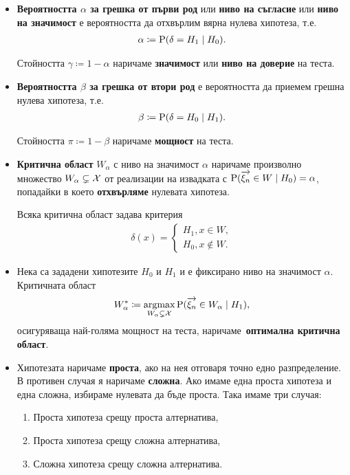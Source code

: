\documentclass[numbers=endperiod, bibliography=totocnumbered]{scrartcl}
\begin{document}
\begin{definition}[Хипотези]
\begin{itemize}
    \item \textbf{Вероятността \( \alpha \) за грешка от първи род} или \textbf{ниво на съгласие} или \textbf{ниво на значимост} е вероятността да отхвърлим вярна нулева хипотеза, т.е.
    \begin{align*}
      \alpha \coloneqq \operatorname{P}(\delta = H_1 \mid H_0).
    \end{align*}

    Стойността \( \gamma \coloneqq 1 - \alpha \) наричаме \textbf{значимост} или \textbf{ниво на доверие} на теста.

    \item \textbf{Вероятността \( \beta \) за грешка от втори род} е вероятността да приемем грешна нулева хипотеза, т.е.
    \begin{align*}
      \beta \coloneqq \operatorname{P}(\delta = H_0 \mid H_1).
    \end{align*}

    Стойността \( \pi \coloneqq 1 - \beta \) наричаме \textbf{мощност} на теста.

    \item \textbf{Критична област} \( W_\alpha \) с ниво на значимост \( \alpha \) наричаме произволно множество \( W_\alpha \subsetneq \mathcal{X} \) от реализации на извадката с \( \operatorname{P}(\overrightarrow{\xi_n} \in W \mid H_0) = \alpha \), попадайки в което \textbf{отхвърляме} нулевата хипотеза.

    Всяка критична област задава критерия
    \begin{align*}
      \delta(x) = \begin{cases}
        H_1, x \in W, \\
        H_0, x \not\in W.
      \end{cases}
    \end{align*}

    \item Нека са зададени хипотезите \( H_0 \) и \( H_1 \) и е фиксирано ниво на значимост \( \alpha \). Критичната област
    \begin{align*}
      W_\alpha^* \coloneqq \operatorname*{\operatorname{argmax}}_{W_\alpha \subsetneq \mathcal{X}} \operatorname{P}(\overrightarrow{\xi_n} \in W_\alpha \mid H_1),
    \end{align*}
    осигуряваща най-голяма мощност на теста, наричаме~\textbf{оптимална критична област}.

    \item Хипотезата наричаме \textbf{проста}, ако на нея отговаря точно едно разпределение. В противен случая я наричаме \textbf{сложна}. Ако имаме една проста хипотеза и една сложна, избираме нулевата да бъде проста. Така имаме три случая:
    \begin{enumerate}
      \item Проста хипотеза срещу проста алтернатива,
      \item Проста хипотеза срещу сложна алтернатива,
      \item Сложна хипотеза срещу сложна алтернатива.
    \end{enumerate}


\end{itemize}
\end{definition}
\end{document}
